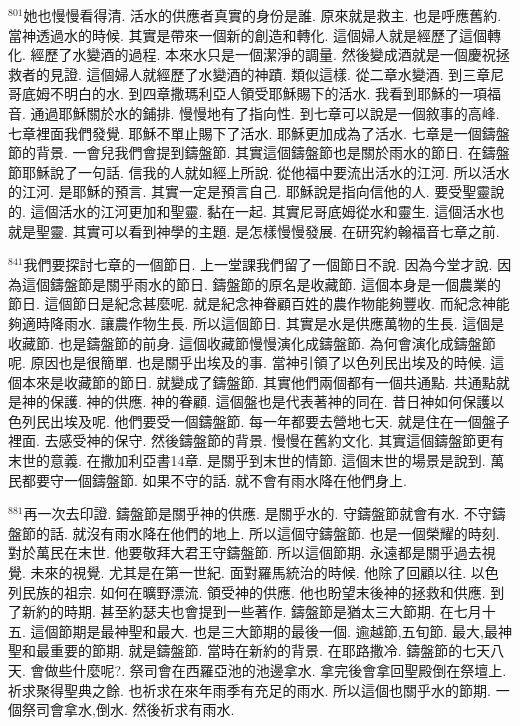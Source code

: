 \documentclass{book}
\begin{document}
$^{801}$她也慢慢看得清.
活水的供應者真實的身份是誰.
原來就是救主.
也是呼應舊約.
當神透過水的時候.
其實是帶來一個新的創造和轉化.
這個婦人就是經歷了這個轉化.
經歷了水變酒的過程.
本來水只是一個潔淨的調量.
然後變成酒就是一個慶祝拯救者的見證.
這個婦人就經歷了水變酒的神蹟.
類似這樣.
從二章水變酒.
到三章尼哥底姆不明白的水.
到四章撒瑪利亞人領受耶穌賜下的活水.
我看到耶穌的一項福音.
通過耶穌關於水的鋪排.
慢慢地有了指向性.
到七章可以說是一個敘事的高峰.
七章裡面我們發覺.
耶穌不單止賜下了活水.
耶穌更加成為了活水.
七章是一個鑄盤節的背景.
一會兒我們會提到鑄盤節.
其實這個鑄盤節也是關於雨水的節日.
在鑄盤節耶穌說了一句話.
信我的人就如經上所說.
從他福中要流出活水的江河.
所以活水的江河.
是耶穌的預言.
其實一定是預言自己.
耶穌說是指向信他的人.
要受聖靈說的.
這個活水的江河更加和聖靈.
黏在一起.
其實尼哥底姆從水和靈生.
這個活水也就是聖靈.
其實可以看到神學的主題.
是怎樣慢慢發展.
在研究約翰福音七章之前.

$^{841}$我們要探討七章的一個節日.
上一堂課我們留了一個節日不說.
因為今堂才說.
因為這個鑄盤節是關乎雨水的節日.
鑄盤節的原名是收藏節.
這個本身是一個農業的節日.
這個節日是紀念甚麼呢.
就是紀念神眷顧百姓的農作物能夠豐收.
而紀念神能夠適時降雨水.
讓農作物生長.
所以這個節日.
其實是水是供應萬物的生長.
這個是收藏節.
也是鑄盤節的前身.
這個收藏節慢慢演化成鑄盤節.
為何會演化成鑄盤節呢.
原因也是很簡單.
也是關乎出埃及的事.
當神引領了以色列民出埃及的時候.
這個本來是收藏節的節日.
就變成了鑄盤節.
其實他們兩個都有一個共通點.
共通點就是神的保護.
神的供應.
神的眷顧.
這個盤也是代表著神的同在.
昔日神如何保護以色列民出埃及呢.
他們要受一個鑄盤節.
每一年都要去營地七天.
就是住在一個盤子裡面.
去感受神的保守.
然後鑄盤節的背景.
慢慢在舊約文化.
其實這個鑄盤節更有末世的意義.
在撒加利亞書14章.
是關乎到末世的情節.
這個末世的場景是說到.
萬民都要守一個鑄盤節.
如果不守的話.
就不會有雨水降在他們身上.

$^{881}$再一次去印證.
鑄盤節是關乎神的供應.
是關乎水的.
守鑄盤節就會有水.
不守鑄盤節的話.
就沒有雨水降在他們的地上.
所以這個守鑄盤節.
也是一個榮耀的時刻.
對於萬民在末世.
他要敬拜大君王守鑄盤節.
所以這個節期.
永遠都是關乎過去視覺.
未來的視覺.
尤其是在第一世紀.
面對羅馬統治的時候.
他除了回顧以往.
以色列民族的祖宗.
如何在曠野漂流.
領受神的供應.
他也盼望末後神的拯救和供應.
到了新約的時期.
甚至約瑟夫也會提到一些著作.
鑄盤節是猶太三大節期.
在七月十五.
這個節期是最神聖和最大.
也是三大節期的最後一個.
逾越節,五旬節.
最大,最神聖和最重要的節期.
就是鑄盤節.
當時在新約的背景.
在耶路撒冷.
鑄盤節的七天八天.
會做些什麼呢?.
祭司會在西羅亞池的池邊拿水.
拿完後會拿回聖殿倒在祭壇上.
祈求聚得聖典之餘.
也祈求在來年雨季有充足的雨水.
所以這個也關乎水的節期.
一個祭司會拿水,倒水.
然後祈求有雨水.
\end{document}
